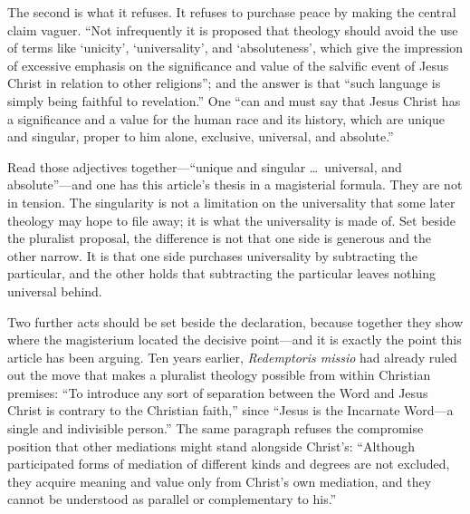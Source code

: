 The second is what it refuses. It refuses to purchase peace by making the central claim vaguer. ``Not infrequently it is proposed that theology should avoid the use of terms like `unicity', `universality', and `absoluteness', which give the impression of excessive emphasis on the significance and value of the salvific event of Jesus Christ in relation to other religions''; and the answer is that ``such language is simply being faithful to revelation.'' One ``can and must say that Jesus Christ has a significance and a value for the human race and its history, which are unique and singular, proper to him alone, exclusive, universal, and absolute.''

Read those adjectives together---``unique and singular \ldots\ universal, and absolute''---and one has this article's thesis in a magisterial formula. They are not in tension. The singularity is not a limitation on the universality that some later theology may hope to file away; it is what the universality is made of. Set beside the pluralist proposal, the difference is not that one side is generous and the other narrow. It is that one side purchases universality by subtracting the particular, and the other holds that subtracting the particular leaves nothing universal behind.

Two further acts should be set beside the declaration, because together they show where the magisterium located the decisive point---and it is exactly the point this article has been arguing. Ten years earlier, \emph{Redemptoris missio} had already ruled out the move that makes a pluralist theology possible from within Christian premises: ``To introduce any sort of separation between the Word and Jesus Christ is contrary to the Christian faith,'' since ``Jesus is the Incarnate Word---a single and indivisible person.'' The same paragraph refuses the compromise position that other mediations might stand alongside Christ's: ``Although participated forms of mediation of different kinds and degrees are not excluded, they acquire meaning and value only from Christ's own mediation, and they cannot be understood as parallel or complementary to his.''

